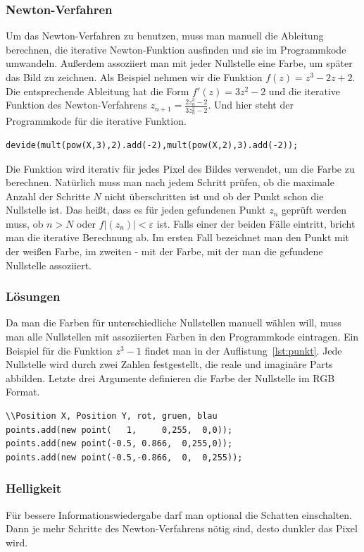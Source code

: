 \documentclass[a4paper,12pt]{llncs}
\numberwithin{equation}{section}
\begin{document}
\subsubsection{Newton-Verfahren}
Um das Newton-Verfahren zu benutzen, muss man manuell die Ableitung berechnen, die iterative Newton-Funktion ausfinden und sie im Programmkode umwandeln.
Außerdem assoziiert man mit jeder Nullstelle eine Farbe, um später das Bild zu zeichnen.
Als Beispiel nehmen wir die Funktion $f(z) = z^3 - 2z + 2$.
Die entsprechende Ableitung hat die Form $f'(z) = 3z^2 - 2$ und die iterative Funktion des Newton-Verfahrens $z_{n+1} = \frac{2z_n^3 - 2}{3z_n^2 - 2}$.
Und hier steht der Programmkode für die iterative Funktion.
\begin{lstlisting}
devide(mult(pow(X,3),2).add(-2),mult(pow(X,2),3).add(-2));
\end{lstlisting}
Die Funktion wird iterativ für jedes Pixel des Bildes verwendet, um die Farbe zu berechnen.
Natürlich muss man nach jedem Schritt prüfen, ob die maximale Anzahl der Schritte $N$ nicht überschritten ist und ob der Punkt schon die Nullstelle ist. 
Das heißt, dass es für jeden gefundenen Punkt $z_n$ geprüft werden muss, ob $n > N$ oder $f|(z_n)| < \varepsilon$ ist.
Falls einer der beiden Fälle eintritt, bricht man die iterative Berechnung ab.
Im ersten Fall bezeichnet man den Punkt mit der weißen Farbe, im zweiten - mit der Farbe, mit der man die gefundene Nullstelle assoziiert. 

\subsubsection{Lösungen} 
Da man die Farben für unterschiedliche Nullstellen manuell wählen will, muss man alle Nullstellen mit assoziierten Farben in den Programmkode eintragen. 
Ein Beispiel für die Funktion $z^3 - 1$ findet man in der Auflistung~\ref{lst:punkt}. 
Jede Nullstelle wird durch zwei Zahlen festgestellt, die reale und imaginäre Parts abbilden.
Letzte drei Argumente definieren die Farbe der Nullstelle im RGB Format.
\begin{lstlisting}[caption=Nullstellen mit Farben für $z^3 - 1$, label=lst:punkt,captionpos=b]
\\Position X, Position Y, rot, gruen, blau
points.add(new point(   1,     0,255,  0,0)); 
points.add(new point(-0.5, 0.866,  0,255,0));
points.add(new point(-0.5,-0.866,  0,  0,255));
\end{lstlisting}

\subsubsection{Helligkeit}
Für bessere Informationswiedergabe darf man optional die Schatten einschalten.
Dann je mehr Schritte des Newton-Verfahrens nötig sind, desto dunkler das Pixel wird.  
\end{document}
